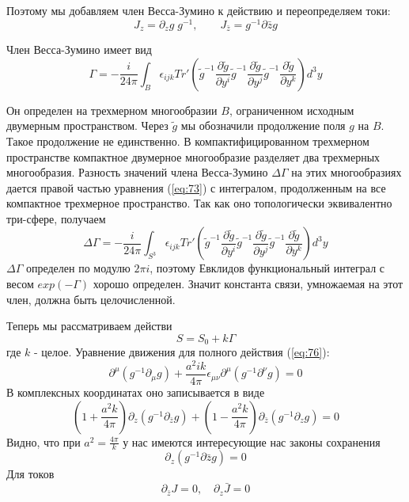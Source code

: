 \documentclass[a4paper,12pt]{article}
\theoremstyle{definition} \newtheorem{Def}{Definition}
\begin{document}
Поэтому мы добавляем член Весса-Зумино к действию и переопределяем токи:
\begin{equation}
  \label{eq:72}
  J_z=\partial_z g\;g^{-1}, \qquad J_{\bar{z}}=g^{-1}\partial{\bar z}g
\end{equation}

Член Весса-Зумино имеет вид
\begin{equation}
  \label{eq:73}
\Gamma= - \frac{i }{24\pi} \int_{B}\epsilon_{ijk} Tr'\left(
    \tilde g^{-1}\frac{\partial \tilde g}{\partial y^i}
      \tilde g^{-1}\frac{\partial \tilde g}{\partial y^j}
      \tilde g^{-1}\frac{\partial \tilde g}{\partial y^k}\right) d^3y
\end{equation}

Он определен на трехмерном многообразии $B$, ограниченном исходным двумерным пространством.
Через $\tilde{g}$ мы обозначили продолжение поля $g$ на $B$. Такое продолжение не единственно. В компактифицированном трехмерном пространстве компактное двумерное многообразие разделяет два трехмерных многообразия. Разность значений члена Весса-Зумино $\Delta\Gamma$ на этих многообразиях дается правой частью уравнения (\ref{eq:73}) с интегралом, продолженным на все компактное трехмерное пространство. Так как оно топологически эквивалентно три-сфере, получаем
\begin{equation}
  \label{eq:75}
\Delta\Gamma= - \frac{i }{24\pi} \int_{S^3}\epsilon_{ijk} Tr'\left(
    \tilde g^{-1}\frac{\partial \tilde g}{\partial y^i}
      \tilde g^{-1}\frac{\partial \tilde g}{\partial y^j}
      \tilde g^{-1}\frac{\partial \tilde g}{\partial y^k}\right) d^3y
\end{equation}
$\Delta\Gamma$ определен по модулю $2\pi i$, поэтому Евклидов функциональный интеграл с весом $exp(-\Gamma)$ хорошо определен. Значит константа связи, умножаемая на этот член, должна быть целочисленной.

Теперь мы рассматриваем действи
\begin{equation}
  \label{eq:76}
  S=S_0+k\Gamma
\end{equation}
где $k$ - целое.
Уравнение движения для полного действия (\ref{eq:76}):
\begin{equation}
  \label{eq:77}
  \partial^{\mu}(g^{-1}\partial_{\mu}g)+\frac{a^2 ik}{4\pi}\epsilon_{\mu\nu}\partial^{\mu}(g^{-1}\partial^{\nu}g)=0
\end{equation}
В комплексных координатах оно записывается в виде
\begin{equation}
  \label{eq:78}
  (1+\frac{a^2 k}{4\pi})\partial_z(g^{-1}\partial_{\bar z}g)+(1-\frac{a^2 k}{4\pi})\partial_{\bar z}(g^{-1}\partial_z g)=0
\end{equation}
Видно, что при $a^2=\frac{4\pi}{k}$ у нас имеются интересующие нас законы сохранения
\begin{equation}
  \label{eq:79}
  \partial_z(g^{-1}\partial{\bar z}g)=0
\end{equation}
Для токов
\begin{equation}
  \label{eq:100}
  \partial_{\bar z}J=0,\quad \partial_z \bar J=0
\end{equation}
\end{document}
